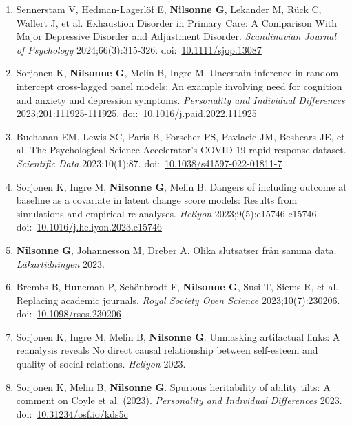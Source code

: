 \documentclass[11pt,a4paper]{article}
\begin{document}
\begin{enumerate}
\item Sennerstam V, Hedman-Lagerlöf E, \textbf{Nilsonne G}, Lekander M, Rück C, Wallert J, et al. Exhaustion Disorder in Primary Care: A Comparison With Major Depressive Disorder and Adjustment Disorder. \textit{Scandinavian Journal of Psychology} 2024;66(3):315-326. doi:~\href{https://doi.org/10.1111/sjop.13087}{10.1111/sjop.13087}

\item Sorjonen K, \textbf{Nilsonne G}, Melin B, Ingre M. Uncertain inference in random intercept cross-lagged panel models: An example involving need for cognition and anxiety and depression symptoms. \textit{Personality and Individual Differences} 2023;201:111925-111925. doi:~\href{https://doi.org/10.1016/j.paid.2022.111925}{10.1016/j.paid.2022.111925}

\item Buchanan EM, Lewis SC, Paris B, Forscher PS, Pavlacic JM, Beshears JE, et al. The Psychological Science Accelerator’s COVID-19 rapid-response dataset. \textit{Scientific Data} 2023;10(1):87. doi:~\href{https://doi.org/10.1038/s41597-022-01811-7}{10.1038/s41597-022-01811-7}

\item Sorjonen K, Ingre M, \textbf{Nilsonne G}, Melin B. Dangers of including outcome at baseline as a covariate in latent change score models: Results from simulations and empirical re-analyses. \textit{Heliyon} 2023;9(5):e15746-e15746. doi:~\href{https://doi.org/10.1016/j.heliyon.2023.e15746}{10.1016/j.heliyon.2023.e15746}

\item \textbf{Nilsonne G}, Johannesson M, Dreber A. Olika slutsatser från samma data. \textit{Läkartidningen} 2023.

\item Brembs B, Huneman P, Schönbrodt F, \textbf{Nilsonne G}, Susi T, Siems R, et al. Replacing academic journals. \textit{Royal Society Open Science} 2023;10(7):230206. doi:~\href{https://doi.org/10.1098/rsos.230206}{10.1098/rsos.230206}

\item Sorjonen K, Ingre M, Melin B, \textbf{Nilsonne G}. Unmasking artifactual links: A reanalysis reveals No direct causal relationship between self-esteem and quality of social relations. \textit{Heliyon} 2023.

\item Sorjonen K, Melin B, \textbf{Nilsonne G}. Spurious heritability of ability tilts: A comment on Coyle et al. (2023). \textit{Personality and Individual Differences} 2023. doi:~\href{https://doi.org/10.31234/osf.io/kds5c}{10.31234/osf.io/kds5c}


\end{enumerate}
\end{document}
